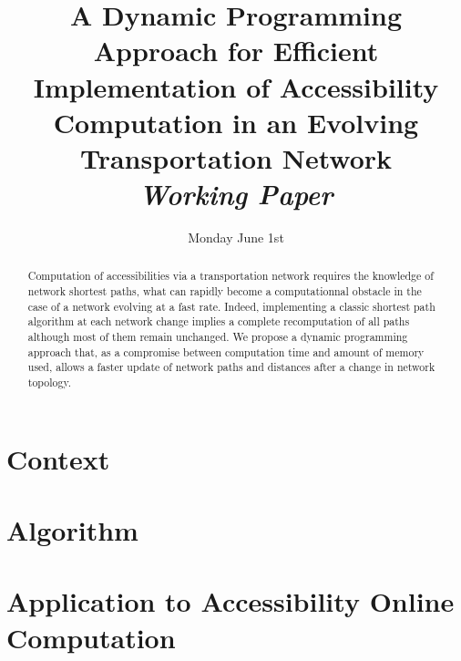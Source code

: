 


\title{A Dynamic Programming Approach for Efficient Implementation of Accessibility Computation in an Evolving Transportation Network\bigskip\\
\textit{Working Paper}
}
\author{}
\date{Monday June 1st}


\maketitle

\justify


\begin{abstract}
Computation of accessibilities via a transportation network requires the knowledge of network shortest paths, what can rapidly become a computationnal obstacle in the case of a network evolving at a fast rate. Indeed, implementing a classic shortest path algorithm at each network change implies a complete recomputation of all paths although most of them remain unchanged. We propose a dynamic programming approach that, as a compromise between computation time and amount of memory used, allows a faster update of network paths and distances after a change in network topology.
\end{abstract}


\section{Context}





\section{Algorithm}




\section{Application to Accessibility Online Computation}




















